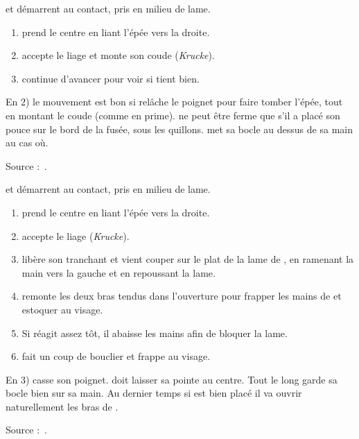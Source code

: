 \begin{exercice}
\label{épée-bocle:I33:ex:krucke-liage}

\A et \D démarrent au contact, pris en milieu de lame.

\begin{enumerate}
	\item \A prend le centre en liant l'épée vers la droite.
	\item \D accepte le liage et monte son coude (\emph{Krucke}).
	\item \A continue d'avancer pour voir si \D tient bien.
\end{enumerate}

En 2) le mouvement est bon si \D relâche le poignet pour faire tomber l'épée, tout en montant le coude (comme en prime).
\D ne peut être ferme que s'il a placé son pouce sur le bord de la fusée, sous les quillons.
\D met sa bocle au dessus de sa main au cas où.

Source :~\cite{fuhrmann:dijon:I33_liage:2015}.

\end{exercice}


\begin{technique}

\A et \D démarrent au contact, pris en milieu de lame.

\begin{enumerate}
	\item \A prend le centre en liant l'épée vers la droite.
	\item \D accepte le liage (\emph{Krucke}).
	\item \A libère son tranchant et vient couper sur le plat de la lame de \D, en ramenant la main vers la gauche et en repoussant la lame.
	\item \A remonte les deux bras tendus dans l'ouverture pour frapper les mains de \D et estoquer au visage.
	\item Si \D réagit assez tôt, il abaisse les mains afin de bloquer la lame.
	\item \A fait un coup de bouclier et frappe au visage.
\end{enumerate}

En 3) \A casse son poignet. \A doit laisser sa pointe au centre.
Tout le long \A garde sa bocle bien sur sa main.
Au dernier temps si \A est bien placé il va ouvrir naturellement les bras de \D.

Source :~\cite{fuhrmann:dijon:I33_liage:2015}.

\end{technique}


